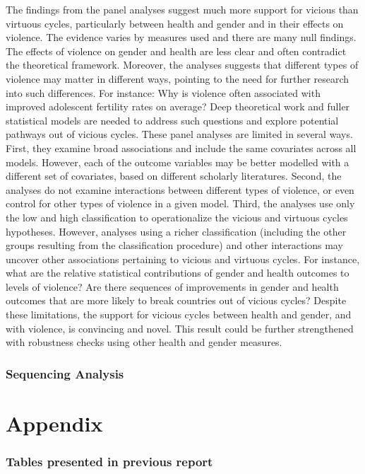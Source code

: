 \documentclass[12pt]{article}
\begin{document}
The findings from the panel analyses suggest much more support for vicious than virtuous cycles, particularly between health and gender and in their effects on violence. The evidence varies by measures used and there are many null findings. The effects of violence on gender and health are less clear and often contradict the theoretical framework. Moreover, the analyses suggests that different types of violence may matter in different ways, pointing to the need for further research into such differences. For instance: Why is violence often associated with improved adolescent fertility rates on average?
Deep theoretical work and fuller statistical models are needed to address such questions and explore potential pathways out of vicious cycles. These panel analyses are limited in several ways. First, they examine broad associations and include the same covariates across all models. However, each of the outcome variables may be better modelled with a different set of covariates, based on different scholarly literatures. Second, the analyses do not examine interactions between different types of violence, or even control for other types of violence in a given model. Third, the analyses use only the low and high classification to operationalize the vicious and virtuous cycles hypotheses. However, analyses using a richer classification (including the other groups resulting from the classification procedure) and other interactions may uncover other associations pertaining to vicious and virtuous cycles. For instance, what are the relative statistical contributions of gender and health outcomes to levels of violence? Are there sequences of improvements in gender and health outcomes that are more likely to break countries out of vicious cycles? Despite these limitations, the support for vicious cycles between health and gender, and with violence, is convincing and novel. This result could be further strengthened with robustness checks using other health and gender measures.

\section{Sequencing Analysis}

\appendix
\part*{Appendix}

\section{Tables presented in previous report}
\end{document}

